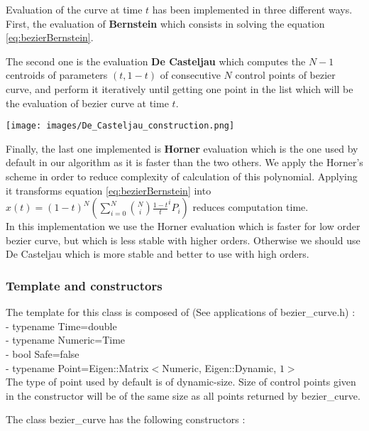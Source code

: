 \documentclass{article}
\begin{document}
    Evaluation of the curve at time $t$ has been implemented in three different ways.
    First, the evaluation of \textbf{Bernstein} which consists in solving the equation \eqref{eq:bezierBernstein}.

    The second one is the evaluation \textbf{De Casteljau} which computes the $N-1$ centroids of parameters $(t,1-t)$ of consecutive $N$ control points of bezier curve, and perform it iteratively until getting one point in the list which will be the evaluation of bezier curve at time $t$.
    \begin{center}
        \texttt{[image: images/De\_Casteljau\_construction.png]}
    \end{center}

    Finally, the last one implemented is  \textbf{Horner} evaluation which is the one used by default in our algorithm as it is faster than the two others. We apply the Horner's scheme in order to reduce complexity of calculation of this polynomial. Applying it transforms equation \eqref{eq:bezierBernstein} into $ x(t) = (1-t)^N(\sum_{i=0}^{N} \binom{N}{i} \frac{1-t}{t}^i P_i)$ reduces computation time.\\

    In this implementation we use the Horner evaluation which is faster for low order bezier curve, but which is less stable with higher orders. Otherwise we should use De Casteljau which is more stable and better to use with high orders.\\

    \subsubsection{Template and constructors}

    The template for this class is composed of (See applications of bezier\_curve.h) :\\
    - typename Time=double\\
    - typename Numeric=Time\\
    - bool Safe=false\\
    - typename Point=Eigen::Matrix$<$Numeric, Eigen::Dynamic, $1>$\\
    The type of point used by default is of dynamic-size. Size of control points given in the constructor will be of the same size as all points returned by bezier\_curve.

    \noindent
    The class bezier\_curve has the following constructors :
\end{document}
